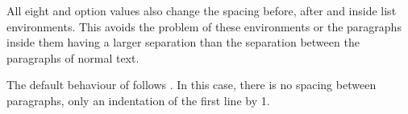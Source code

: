 All eight  and  option values
also change the spacing before, after and inside list environments. This
avoids the problem of these environments or the paragraphs inside them having
a larger separation than the separation between the paragraphs of normal text.
%

The default behaviour of {\KOMAScript} follows
. In this case, there is no spacing between
paragraphs, only an indentation of the first line by 1.%
%
%
%
\fi %


